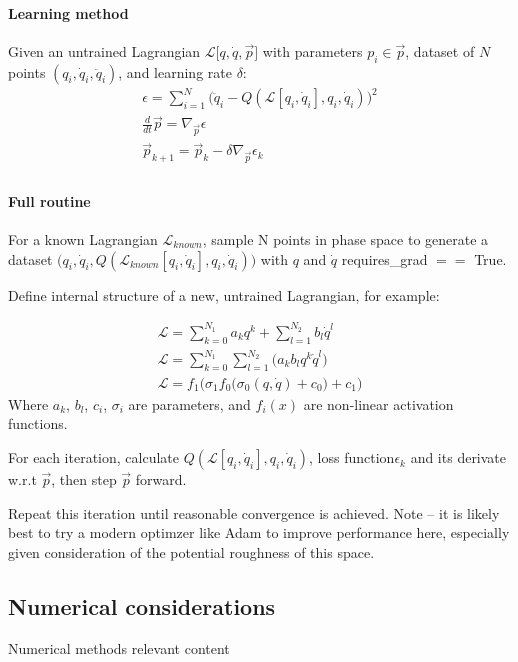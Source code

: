 \documentclass[]{article}
\begin{document}
\paragraph{Learning method}
Given an untrained Lagrangian $\mathcal{L}\big[q,\dot{q},\vec{p}\big] $ with parameters $p_i\in \vec{p}$, dataset of $N$ points $(q_i, \dot{q}_i, \ddot{q}_i)$, and learning rate $\delta$:
\begin{eqnarray}
	\epsilon = \sum_{i=1}^{N} \Big(\ddot{q}_i - Q( \mathcal{L}[q_i,\dot{q}_i],q_i,\dot{q}_i)\Big)^2 \\
	\frac{d}{dt} \vec{p} = \nabla_{\vec{p}} \epsilon \\
	\vec{p}_{k+1} = \vec{p}_k- \delta \nabla_{\vec{p}}  \epsilon_k\\
\end{eqnarray}

\paragraph{Full routine}

For a known Lagrangian $\mathcal{L}_{known}$, sample N points in phase space to generate a dataset $\big(q_i,\dot{q}_i,Q(\mathcal{L}_{known}[q_i,\dot{q}_i],q_i,\dot{q}_i)\big) $ with $q$ and $\dot{q}$ requires\_grad $==$ True.

Define internal structure of a new, untrained Lagrangian, for example:

\begin{eqnarray*}
	\mathcal{L} = \sum_{k=0}^{N_1} a_k q^k + \sum_{l=1}^{N_2} b_l \dot{q}^l \\
	\mathcal{L} = \sum_{k=0}^{N_1}\sum_{l=1}^{N_2} \Big( a_k b_l q^k \dot{q}^l\Big) \\
	\mathcal{L} = f_1\Big(\sigma_1 f_0\big(\sigma_0 (q,\dot{q}) + c_0\big) +c_1\Big)
\end{eqnarray*}
Where $a_k$, $b_l$, $c_i$, $\sigma_i$ are parameters, and $f_i(x)$ are non-linear activation functions.

For each iteration, calculate $Q(\mathcal{L}[q_i,\dot{q}_i],q_i,\dot{q}_i)$, loss function$\epsilon_k$ and its derivate w.r.t $\vec{p}$, then step $\vec{p}$ forward.

Repeat this iteration until reasonable convergence is achieved. Note -- it is likely best to try a modern optimzer like Adam to improve performance here, especially given consideration of the potential roughness of this space.

\subsection{Numerical considerations}
Numerical methods relevant content
\end{document}

